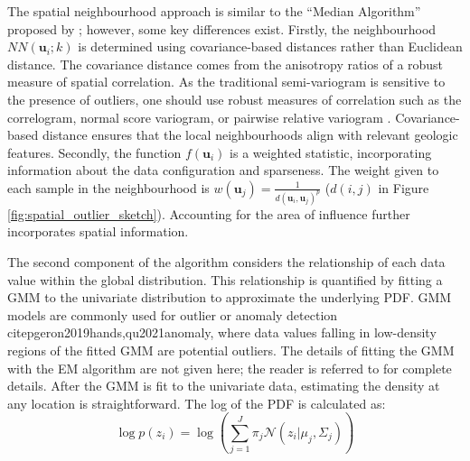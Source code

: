 The spatial neighbourhood approach is similar to the ``Median Algorithm'' proposed by \cite{chen2008detecting}; however, some key differences exist. Firstly, the neighbourhood $NN(\mathbf{u}_{i}; k)$ is determined using covariance-based distances rather than Euclidean distance. The covariance distance comes from the anisotropy ratios of a robust measure of spatial correlation. As the traditional semi-variogram is sensitive to the presence of outliers, one should use robust measures of correlation such as the correlogram, normal score variogram, or pairwise relative variogram \citep{babakhani2014geostatistical,drumond2019using}. Covariance-based distance ensures that the local neighbourhoods align with relevant geologic features. Secondly, the function $f(\mathbf{u}_{i})$ is a weighted statistic, incorporating information about the data configuration and sparseness. The weight given to each sample in the neighbourhood is $w(\mathbf{u}_{j})=\frac{1}{d(\mathbf{u}_{i},\mathbf{u}_{j})^{p}}$ ($d(i,j)$ in Figure \ref{fig:spatial_outlier_sketch}). Accounting for the area of influence further incorporates spatial information.

The second component of the algorithm considers the relationship of each data value within the global distribution. This relationship is quantified by fitting a \gls{GMM} to the univariate distribution to approximate the underlying \gls{PDF}. \Gls{GMM} models are commonly used for outlier or anomaly detection citep{geron2019hands,qu2021anomaly}, where data values falling in low-density regions of the fitted \gls{GMM} are potential outliers. The details of fitting the \gls{GMM} with the \gls{EM} algorithm are not given here; the reader is referred to \cite{mclachlan2019finite} for complete details. After the \gls{GMM} is fit to the univariate data, estimating the density at any location is straightforward. The log of the \gls{PDF} is calculated as:
\begin{equation}
    \log p(z_{i}) = \log \left( \sum_{j=1}^{J} \pi_{j} \mathcal{N}(z_{i}|\mu_{j}, \Sigma_{j}) \right)
    \label{eq:logprob}
\end{equation}

